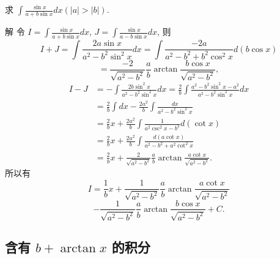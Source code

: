 \documentclass[lang=cn,newtx,10pt,scheme=chinese]{elegantbook}
\begin{document}
\begin{example}
  求 $\int \frac{\sin x}{a + b \sin x} dx (|a| > |b|)$.
\end{example}
\begin{solution}
  解 令 $I = \int \frac{\sin x}{a + b \sin x} dx$, $J = \int \frac{\sin x}{a - b \sin x} dx$,
  则
  $$
  I + J = \int \frac{2 a \sin x}{a^2 - b^2 \sin^2 x} dx = \int \frac{-2 a}{a^2 - b^2 + b^2 \cos^2 x} d(b \cos x)
  $$
  $$
  = \frac{-2}{\sqrt{a^2 - b^2}} \frac{a}{b} \arctan \frac{b \cos x}{\sqrt{a^2 - b^2}},
  $$
  $$
  \begin{aligned}
  I - J &= - \int \frac{2 b \sin^2 x}{a^2 - b^2 \sin^2 x} dx = \frac{2}{b} \int \frac{a^2 - b^2 \sin^2 x - a^2}{a^2 - b^2 \sin^2 x} dx \\
  &= \frac{2}{b} \int dx - \frac{2 a^2}{b} \int \frac{dx}{a^2 - b^2 \sin^2 x} \\
  &= \frac{2}{b} x + \frac{2 a^2}{b} \int \frac{1}{a^2 \csc^2 x - b^2} d(\cot x) \\
  &= \frac{2}{b} x + \frac{2 a^2}{b} \int \frac{d(a \cot x)}{a^2 - b^2 + a^2 \cot^2 x} \\
  &= \frac{2}{b} x + \frac{2}{\sqrt{a^2 - b^2}} \frac{a}{b} \arctan \frac{a \cot x}{\sqrt{a^2 - b^2}}.
  \end{aligned}
  $$
  所以有
  $$
  I = \frac{1}{b} x + \frac{1}{\sqrt{a^2 - b^2}} \frac{a}{b} \arctan \frac{a \cot x}{\sqrt{a^2 - b^2}}
  $$
  $$
  - \frac{1}{\sqrt{a^2 - b^2}} \frac{a}{b} \arctan \frac{b \cos x}{\sqrt{a^2 - b^2}} + C.
  $$
\end{solution}
\subsection{含有 $b + \arctan x$ 的积分}
\end{document}
